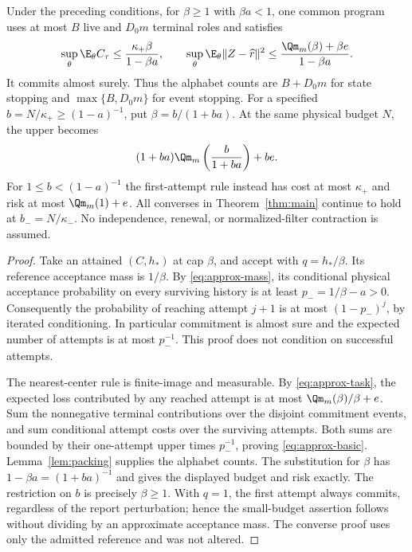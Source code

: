 \begin{theorem}\label{thm:approx}
Under the preceding conditions, for $\beta\ge1$ with $\beta a<1$, one common program uses at most $B$ live and $D_0m$ terminal roles and satisfies
\begin{equation}\label{eq:approx-basic}
 \sup_\theta\E_\theta C_\tau\le\frac{\kappa_+\beta}{1-\beta a},
 \qquad
 \sup_\theta\E_\theta\|Z-\widehat r\|^2
 \le\frac{\Qm_m(\beta)+\beta e}{1-\beta a}.
\end{equation}
It commits almost surely. Thus the alphabet counts are $B+D_0m$ for state stopping and $\max\{B,D_0m\}$ for event stopping. For a specified $b=N/\kappa_+\ge(1-a)^{-1}$, put $\beta=b/(1+ba)$. At the same physical budget $N$, the upper becomes
\begin{equation}\label{eq:approx-budget}
 (1+ba)\Qm_m\left(\frac b{1+ba}\right)+be.
\end{equation}
For $1\le b<(1-a)^{-1}$ the first-attempt rule instead has cost at most $\kappa_+$ and risk at most $\Qm_m(1)+e$. All converses in Theorem~\ref{thm:main} continue to hold at $b_-=N/\kappa_-$. No independence, renewal, or normalized-filter contraction is assumed.
\end{theorem}
\begin{proof}
Take an attained $(C,h_*)$ at cap $\beta$, and accept with $q=h_*/\beta$. Its reference acceptance mass is $1/\beta$. By \eqref{eq:approx-mass}, its conditional physical acceptance probability on every surviving history is at least $p_-=1/\beta-a>0$. Consequently the probability of reaching attempt $j+1$ is at most $(1-p_-)^j$, by iterated conditioning. In particular commitment is almost sure and the expected number of attempts is at most $p_-^{-1}$. This proof does not condition on successful attempts.

The nearest-center rule is finite-image and measurable. By \eqref{eq:approx-task}, the expected loss contributed by any reached attempt is at most $\Qm_m(\beta)/\beta+e$. Sum the nonnegative terminal contributions over the disjoint commitment events, and sum conditional attempt costs over the surviving attempts. Both sums are bounded by their one-attempt upper times $p_-^{-1}$, proving \eqref{eq:approx-basic}. Lemma~\ref{lem:packing} supplies the alphabet counts. The substitution for $\beta$ has $1-\beta a=(1+ba)^{-1}$ and gives the displayed budget and risk exactly. The restriction on $b$ is precisely $\beta\ge1$. With $q=1$, the first attempt always commits, regardless of the report perturbation; hence the small-budget assertion follows without dividing by an approximate acceptance mass. The converse proof uses only the admitted reference and was not altered.
\end{proof}

